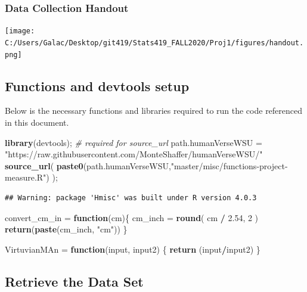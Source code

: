 \documentclass[]{article}
\newenvironment{Shaded}{\begin{snugshade}}{\end{snugshade}}
\newcommand{\CommentTok}[1]{\textcolor[rgb]{0.56,0.35,0.01}{\textit{#1}}}
\newcommand{\ControlFlowTok}[1]{\textcolor[rgb]{0.13,0.29,0.53}{\textbf{#1}}}
\newcommand{\DecValTok}[1]{\textcolor[rgb]{0.00,0.00,0.81}{#1}}
\newcommand{\FloatTok}[1]{\textcolor[rgb]{0.00,0.00,0.81}{#1}}
\newcommand{\KeywordTok}[1]{\textcolor[rgb]{0.13,0.29,0.53}{\textbf{#1}}}
\newcommand{\NormalTok}[1]{#1}
\newcommand{\OperatorTok}[1]{\textcolor[rgb]{0.81,0.36,0.00}{\textbf{#1}}}
\newcommand{\StringTok}[1]{\textcolor[rgb]{0.31,0.60,0.02}{#1}}
\begin{document}
\subsubsection{Data Collection Handout}

\texttt{[image: C:/Users/Galac/Desktop/git419/Stats419\_FALL2020/Proj1/figures/handout.png]}
\label{sec:Provenance- Data Collection Handout}

\subsection{Functions and devtools setup}

Below is the necessary functions and libraries required to run the code
referenced in this document.

\begin{Shaded}
\begin{Highlighting}[]
\KeywordTok{library}\NormalTok{(devtools);       }\CommentTok{\# required for source\_url}
\NormalTok{path.humanVerseWSU =}\StringTok{ "https://raw.githubusercontent.com/MonteShaffer/humanVerseWSU/"}
\KeywordTok{source\_url}\NormalTok{( }\KeywordTok{paste0}\NormalTok{(path.humanVerseWSU,}\StringTok{"master/misc/functions{-}project{-}measure.R"}\NormalTok{) );}
\end{Highlighting}
\end{Shaded}

\begin{verbatim}
## Warning: package 'Hmisc' was built under R version 4.0.3
\end{verbatim}

\begin{Shaded}
\begin{Highlighting}[]
\NormalTok{convert\_cm\_in =}\StringTok{ }\ControlFlowTok{function}\NormalTok{(cm)\{}
\NormalTok{  cm\_inch =}\StringTok{ }\KeywordTok{round}\NormalTok{( cm }\OperatorTok{/}\StringTok{ }\FloatTok{2.54}\NormalTok{, }\DecValTok{2}\NormalTok{ )}
  \KeywordTok{return}\NormalTok{(}\KeywordTok{paste}\NormalTok{(cm\_inch, }\StringTok{"cm"}\NormalTok{))}
\NormalTok{\}}


\NormalTok{VirtuvianMAn =}\StringTok{ }\ControlFlowTok{function}\NormalTok{(input, input2)}
\NormalTok{  \{}
    \KeywordTok{return}\NormalTok{ (input}\OperatorTok{/}\NormalTok{input2)}
\NormalTok{  \}}
\end{Highlighting}
\end{Shaded}

\subsection{Retrieve the Data Set}
\end{document}
